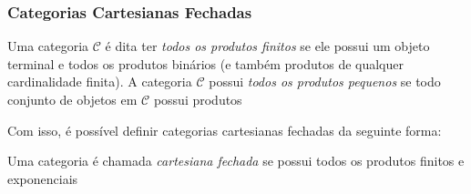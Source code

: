 \documentclass[../main.tex]{subfiles}
\begin{document}
\subsubsection{Categorias Cartesianas Fechadas}

\begin{definition}
    Uma categoria $\mathcal{C}$ é dita ter \emph{todos os produtos finitos} se ele possui um objeto terminal e todos os produtos binários (e também produtos de qualquer cardinalidade finita). A categoria $\mathcal{C}$ possui \emph{todos os produtos pequenos} se todo conjunto de objetos em $\mathcal{C}$ possui produtos 
\end{definition}

Com isso, é possível definir categorias cartesianas fechadas da seguinte forma:

\begin{definition}
    Uma categoria é chamada \emph{cartesiana fechada} se possui todos os produtos finitos e exponenciais
\end{definition}
\end{document}
